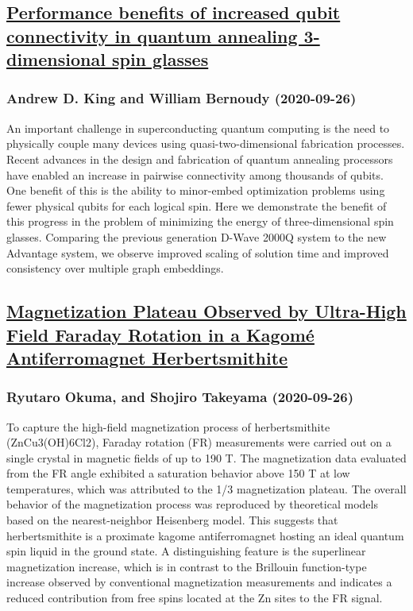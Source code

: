 \subsection*{\href{http://arxiv.org/abs/2009.12479v1}{Performance benefits of increased qubit connectivity in quantum  annealing 3-dimensional spin glasses}}
\subsubsection*{Andrew D. King and William Bernoudy (2020-09-26)}
An important challenge in superconducting quantum computing is the need to
physically couple many devices using quasi-two-dimensional fabrication
processes. Recent advances in the design and fabrication of quantum annealing
processors have enabled an increase in pairwise connectivity among thousands of
qubits. One benefit of this is the ability to minor-embed optimization problems
using fewer physical qubits for each logical spin. Here we demonstrate the
benefit of this progress in the problem of minimizing the energy of
three-dimensional spin glasses. Comparing the previous generation D-Wave 2000Q
system to the new Advantage system, we observe improved scaling of solution
time and improved consistency over multiple graph embeddings.

\subsection*{\href{http://arxiv.org/abs/2009.12476v1}{Magnetization Plateau Observed by Ultra-High Field Faraday Rotation in a  Kagomé Antiferromagnet Herbertsmithite}}
\subsubsection*{Ryutaro Okuma, and Shojiro Takeyama (2020-09-26)}
To capture the high-field magnetization process of herbertsmithite
(ZnCu3(OH)6Cl2), Faraday rotation (FR) measurements were carried out on a
single crystal in magnetic fields of up to 190 T. The magnetization data
evaluated from the FR angle exhibited a saturation behavior above 150 T at low
temperatures, which was attributed to the 1/3 magnetization plateau. The
overall behavior of the magnetization process was reproduced by theoretical
models based on the nearest-neighbor Heisenberg model. This suggests that
herbertsmithite is a proximate kagome antiferromagnet hosting an ideal quantum
spin liquid in the ground state. A distinguishing feature is the superlinear
magnetization increase, which is in contrast to the Brillouin function-type
increase observed by conventional magnetization measurements and indicates a
reduced contribution from free spins located at the Zn sites to the FR signal.

